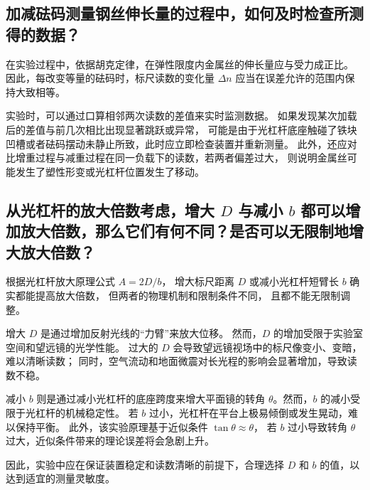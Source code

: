 \documentclass{../template/Report}%
\begin{document}
\begin{fullreportonly}
    \subsection{加减砝码测量钢丝伸长量的过程中，如何及时检查所测得的数据？}

    在实验过程中，依据胡克定律，在弹性限度内金属丝的伸长量应与受力成正比。
    因此，每改变等量的砝码时，标尺读数的变化量 $\Delta n$ 应当在误差允许的范围内保持大致相等。

    实验时，可以通过口算相邻两次读数的差值来实时监测数据。
    如果发现某次加载后的差值与前几次相比出现显著跳跃或异常，
    可能是由于光杠杆底座触碰了铁块凹槽或者砝码摆动未静止所致，此时应立即检查装置并重新测量。
    此外，还应对比增重过程与减重过程在同一负载下的读数，若两者偏差过大，
    则说明金属丝可能发生了塑性形变或光杠杆位置发生了移动。

    \subsection{从光杠杆的放大倍数考虑，增大 $D$ 与减小 $b$ 都可以增加放大倍数，那么它们有何不同？是否可以无限制地增大放大倍数？}

    根据光杠杆放大原理公式 $A = 2D/b$，
    增大标尺距离 $D$ 或减小光杠杆短臂长 $b$ 确实都能提高放大倍数，
    但两者的物理机制和限制条件不同，
    且都不能无限制调整。

    增大 $D$ 是通过增加反射光线的“力臂”来放大位移。
    然而，$D$ 的增加受限于实验室空间和望远镜的光学性能。
    过大的 $D$ 会导致望远镜视场中的标尺像变小、变暗，难以清晰读数；
    同时，空气流动和地面微震对长光程的影响会显著增加，导致读数不稳。

    减小 $b$ 则是通过减小光杠杆的底座跨度来增大平面镜的转角 $\theta$。然而，$b$ 的减小受限于光杠杆的机械稳定性。
    若 $b$ 过小，光杠杆在平台上极易倾倒或发生晃动，难以保持平衡。
    此外，该实验原理基于近似条件 $\tan\theta \approx \theta$，
    若 $b$ 过小导致转角 $\theta$ 过大，近似条件带来的理论误差将会急剧上升。

    因此，实验中应在保证装置稳定和读数清晰的前提下，合理选择 $D$ 和 $b$ 的值，以达到适宜的测量灵敏度。
\end{fullreportonly}
\insertnotes
\end{document}
